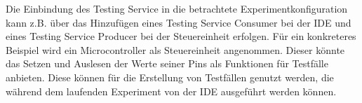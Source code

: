 Die Einbindung des Testing Service in die betrachtete Experimentkonfiguration kann z.B. über das Hinzufügen eines Testing Service Consumer bei der IDE und eines Testing Service Producer bei der Steuereinheit erfolgen. Für ein konkreteres Beispiel wird ein Microcontroller als Steuereinheit angenommen. Dieser könnte das Setzen und Auslesen der Werte seiner Pins als Funktionen für Testfälle anbieten. Diese können für die Erstellung von Testfällen genutzt werden, die während dem laufenden Experiment von der IDE ausgeführt werden können.